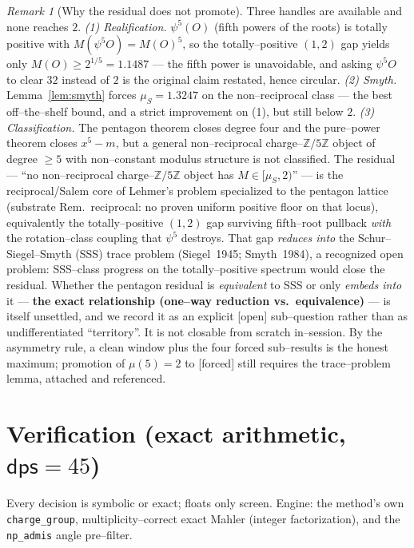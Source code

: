 \documentclass[11pt]{article}
\newcommand{\forced}{\textcolor{cforced}{\textsf{[forced]}}}
\newcommand{\open}{\textcolor{copen}{\textsf{[open]}}}
\newcommand{\Z}{\mathbb{Z}}
\newcommand{\Mah}{M}
\newcommand{\muS}{\mu_S}
\newcommand{\Zfive}{\Z/5\Z}
\theoremstyle{plain}
\theoremstyle{definition}
\theoremstyle{remark}
\newtheorem{remark}[theorem]{Remark}
\begin{document}
\begin{remark}[Why the residual does not promote]\label{rem:notforced}
Three handles are available and none reaches $2$.
\emph{(1) Realification.} $\psi^5(O)$ (fifth powers of the roots) is totally positive with
$\Mah(\psi^5O)=\Mah(O)^5$, so the totally--positive $(1,2)$ gap yields only $\Mah(O)\ge2^{1/5}=1.1487$
--- the fifth power is unavoidable, and asking $\psi^5O$ to clear $32$ instead of $2$ is the original
claim restated, hence circular.
\emph{(2) Smyth.} Lemma~\ref{lem:smyth} forces $\muS=1.3247$ on the non--reciprocal class --- the
best off--the--shelf bound, and a strict improvement on (1), but still below $2$.
\emph{(3) Classification.} The pentagon theorem closes degree four and the pure--power theorem closes
$x^5-m$, but a general non--reciprocal charge--$\Zfive$ object of degree $\ge5$ with non--constant
modulus structure is not classified.
The residual --- ``no non--reciprocal charge--$\Zfive$ object has $\Mah\in[\muS,2)$'' --- is the
reciprocal/Salem core of Lehmer's problem specialized to the pentagon lattice (substrate
Rem.~\textup{reciprocal}: no proven uniform positive floor on that locus), equivalently the
totally--positive $(1,2)$ gap surviving fifth--root pullback \emph{with} the rotation--class coupling
that $\psi^5$ destroys. That gap \emph{reduces into} the Schur--Siegel--Smyth (SSS) trace problem (Siegel~1945;
Smyth~1984), a recognized open problem: SSS--class progress on the totally--positive spectrum
would close the residual. Whether the pentagon residual is \emph{equivalent} to SSS or only
\emph{embeds into} it --- \textbf{the exact relationship (one--way reduction vs.\ equivalence)}
--- is itself unsettled, and we record it as an explicit \open{} sub--question rather than as
undifferentiated ``territory''. It is not closable from scratch in--session. By the asymmetry rule, a clean window plus the four forced sub--results is
the honest maximum; promotion of $\mu(5)=2$ to \forced{} still requires the trace--problem lemma,
attached and referenced.
\end{remark}

\section{Verification (exact arithmetic, \texorpdfstring{$\textsf{dps}=45$}{dps=45})}\label{sec:verify}

Every decision is symbolic or exact; floats only screen. Engine: the method's own
\texttt{charge\_group}, multiplicity--correct exact Mahler (integer factorization), and the
\texttt{np\_admis} angle pre--filter.
\end{document}
